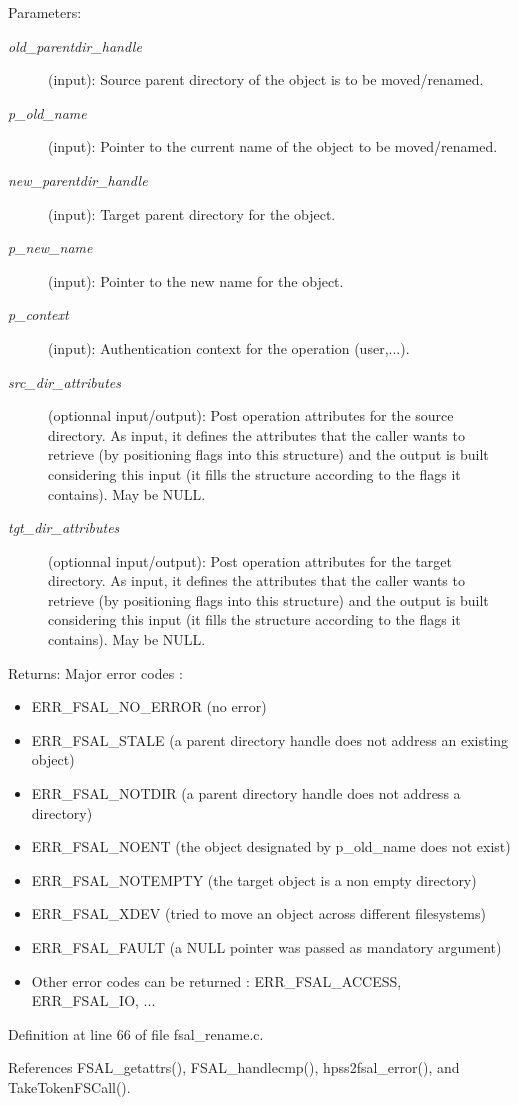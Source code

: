 \begin{Desc}
\item[Parameters:]
\begin{description}
\item[{\em old\_\-parentdir\_\-handle}](input): Source parent directory of the object is to be moved/renamed. \item[{\em p\_\-old\_\-name}](input): Pointer to the current name of the object to be moved/renamed. \item[{\em new\_\-parentdir\_\-handle}](input): Target parent directory for the object. \item[{\em p\_\-new\_\-name}](input): Pointer to the new name for the object. \item[{\em p\_\-context}](input): Authentication context for the operation (user,...). \item[{\em src\_\-dir\_\-attributes}](optionnal input/output): Post operation attributes for the source directory. As input, it defines the attributes that the caller wants to retrieve (by positioning flags into this structure) and the output is built considering this input (it fills the structure according to the flags it contains). May be NULL. \item[{\em tgt\_\-dir\_\-attributes}](optionnal input/output): Post operation attributes for the target directory. As input, it defines the attributes that the caller wants to retrieve (by positioning flags into this structure) and the output is built considering this input (it fills the structure according to the flags it contains). May be NULL.\end{description}
\end{Desc}
\begin{Desc}
\item[Returns:]Major error codes :\begin{itemize}
\item ERR\_\-FSAL\_\-NO\_\-ERROR (no error)\item ERR\_\-FSAL\_\-STALE (a parent directory handle does not address an existing object)\item ERR\_\-FSAL\_\-NOTDIR (a parent directory handle does not address a directory)\item ERR\_\-FSAL\_\-NOENT (the object designated by p\_\-old\_\-name does not exist)\item ERR\_\-FSAL\_\-NOTEMPTY (the target object is a non empty directory)\item ERR\_\-FSAL\_\-XDEV (tried to move an object across different filesystems)\item ERR\_\-FSAL\_\-FAULT (a NULL pointer was passed as mandatory argument)\item Other error codes can be returned : ERR\_\-FSAL\_\-ACCESS, ERR\_\-FSAL\_\-IO, ... \end{itemize}
\end{Desc}


Definition at line 66 of file fsal\_\-rename.c.

References FSAL\_\-getattrs(), FSAL\_\-handlecmp(), hpss2fsal\_\-error(), and TakeTokenFSCall().